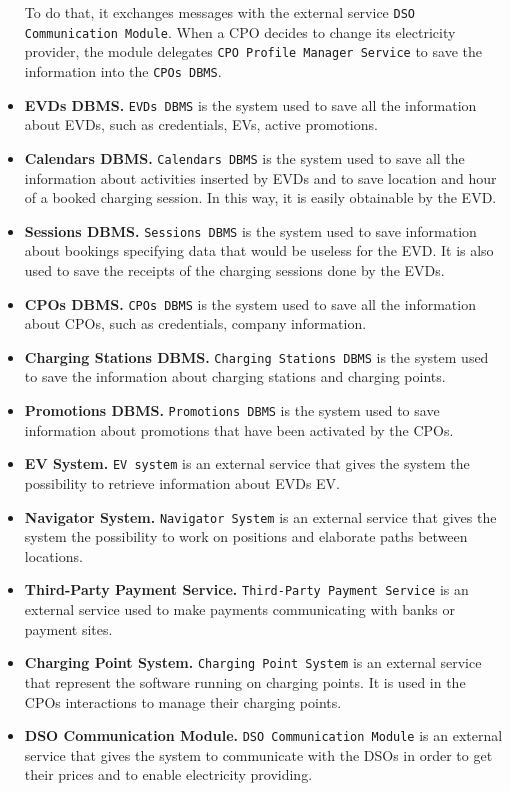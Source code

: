 \begin{itemize}
    To do that, it exchanges messages with the external service \verb|DSO Communication Module|.
    When a CPO decides to change its electricity provider, the module delegates \verb|CPO Profile Manager Service| to
    save the information into the \verb|CPOs DBMS|.
    \item \textbf{EVDs DBMS.} \verb|EVDs DBMS| is the system used to save all the information about EVDs, such as
    credentials, EVs, active promotions.
    \item \textbf{Calendars DBMS.} \verb|Calendars DBMS| is the system used to save all the information about activities
    inserted by EVDs and to save location and hour of a booked charging session.
    In this way, it is easily obtainable by the EVD\@.
    \item \textbf{Sessions DBMS.} \verb|Sessions DBMS| is the system used to save information about bookings
    specifying data that would be useless for the EVD\@.
    It is also used to save the receipts of the charging sessions done by the EVDs.
    \item \textbf{CPOs DBMS.} \verb|CPOs DBMS| is the system used to save all the information about CPOs, such as credentials,
    company information.
    \item \textbf{Charging Stations DBMS.} \verb|Charging Stations DBMS| is the system used to save the information about
    charging stations and charging points.
    \item \textbf{Promotions DBMS.} \verb|Promotions DBMS| is the system used to save information about promotions
    that have been activated by the CPOs.
    \item \textbf{EV System.} \verb|EV system| is an external service that gives the system the possibility to retrieve
    information about EVDs EV\@.
    \item \textbf{Navigator System.} \verb|Navigator System| is an external service that gives the system the possibility
    to work on positions and elaborate paths between locations.
    \item \textbf{Third-Party Payment Service.} \verb|Third-Party Payment Service| is an external service used to
    make payments communicating with banks or payment sites.
    \item \textbf{Charging Point System.} \verb|Charging Point System| is an external service that represent the software
    running on charging points.
    It is used in the CPOs interactions to manage their charging points.
    \item \textbf{DSO Communication Module.} \verb|DSO Communication Module| is an external service that gives the system
    to communicate with the DSOs in order to get their prices and to enable electricity providing.
\end{itemize}


